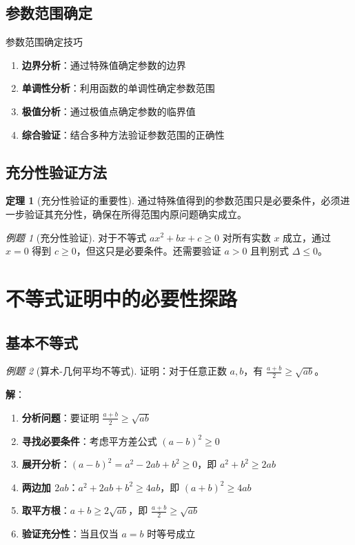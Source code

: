 \documentclass[a4paper,11pt]{ctexart}
\newcommand{\keypoint}[1]{\textcolor{secondary}{\textbf{#1}}}
\theoremstyle{definition}
\newtheorem{theorem}{定理}[section]
\theoremstyle{remark}
\newtheorem{example}{例题}[section]
\begin{document}
\subsection{参数范围确定}

\begin{summarybox}{参数范围确定技巧}
\begin{enumerate}
    \item \textbf{边界分析}：通过特殊值确定参数的边界
    \item \textbf{单调性分析}：利用函数的单调性确定参数范围
    \item \textbf{极值分析}：通过极值点确定参数的临界值
    \item \textbf{综合验证}：结合多种方法验证参数范围的正确性
\end{enumerate}
\end{summarybox}

\subsection{充分性验证方法}

\begin{theorem}[充分性验证的重要性]
通过特殊值得到的参数范围只是必要条件，必须进一步验证其充分性，确保在所得范围内原问题确实成立。
\end{theorem}

\begin{example}[充分性验证]
对于不等式 $ax^2 + bx + c \geq 0$ 对所有实数 $x$ 成立，通过 $x = 0$ 得到 $c \geq 0$，但这只是必要条件。还需要验证 $a > 0$ 且判别式 $\Delta \leq 0$。
\end{example}

\newpage

\section{不等式证明中的必要性探路}

\subsection{基本不等式}

\begin{example}[算术-几何平均不等式]
证明：对于任意正数 $a, b$，有 $\frac{a + b}{2} \geq \sqrt{ab}$。

\textbf{解}：
\begin{enumerate}
    \item \keypoint{分析问题}：要证明 $\frac{a + b}{2} \geq \sqrt{ab}$
    \item \keypoint{寻找必要条件}：考虑平方差公式 $(a - b)^2 \geq 0$
    \item \keypoint{展开分析}：$(a - b)^2 = a^2 - 2ab + b^2 \geq 0$，即 $a^2 + b^2 \geq 2ab$
    \item \keypoint{两边加 $2ab$}：$a^2 + 2ab + b^2 \geq 4ab$，即 $(a + b)^2 \geq 4ab$
    \item \keypoint{取平方根}：$a + b \geq 2\sqrt{ab}$，即 $\frac{a + b}{2} \geq \sqrt{ab}$
    \item \keypoint{验证充分性}：当且仅当 $a = b$ 时等号成立
\end{enumerate}
\end{example}
\end{document}
